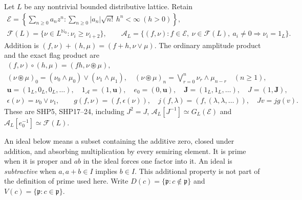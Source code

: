 Let $L$ be any nontrivial bounded distributive lattice. Retain
\begin{equation}\tag{HFP1}
\begin{gathered}
 \mathcal E=\left\{\sum_{n\ge0}a_nz^n:
       \sum_{n\ge0}|a_n|\sqrt{n!}\,h^n<\infty\ (h>0)\right\},\\
 \mathcal F(L)=\{\nu\in L^{\mathbb N_0}:\nu_i\ge\nu_{i+2}\},\qquad
 \mathcal A_L=\{(f,\nu):f\in\mathcal E,\ \nu\in\mathcal F(L),
                         \ a_i\ne0\Rightarrow\nu_i=1_L\}.
\end{gathered}
\end{equation}
Addition is $(f,\nu)+(h,\mu)=(f+h,\nu\vee\mu)$. The ordinary
amplitude product and the exact flag product are
\begin{equation}\tag{HFP2}
\begin{gathered}
 (f,\nu)\circ(h,\mu)=(fh,\nu\circledast\mu),\\
 (\nu\circledast\mu)_0=(\nu_0\wedge\mu_0)\vee(\nu_1\wedge\mu_1),
 \quad
 (\nu\circledast\mu)_n=\bigvee_{r=0}^n\nu_r\wedge\mu_{n-r}\quad(n\ge1),\\
 \mathbf u=(1_L,0_L,0_L,\ldots),\quad
 1_{\mathcal A}=(1,\mathbf u),\quad e_0=(0,\mathbf u),\quad
 \mathbf J=(1_L,1_L,\ldots),\quad J=(1,\mathbf J),\\
 \epsilon(\nu)=\nu_0\vee\nu_1,\qquad
 g(f,\nu)=(f,\epsilon(\nu)),\quad
 j(f,\lambda)=(f,(\lambda,\lambda,\ldots)),\quad Jv=jg(v).
\end{gathered}
\end{equation}
These are SHP5, SHP17--24, including $J^2=J$,
$\mathcal A_L[J^{-1}]\simeq G_L(\mathcal E)$ and
$\mathcal A_L[e_0^{-1}]\simeq\mathcal F(L)$.

An ideal below means a subset containing the additive zero, closed
under addition, and absorbing multiplication by every semiring
element. It is prime when it is proper and $ab$ in the ideal forces
one factor into it. An ideal is \emph{subtractive} when
$a,a+b\in I$ implies $b\in I$. This additional property is not
part of the definition of prime used here. Write
$D(c)=\{\mathfrak p:c\notin\mathfrak p\}$ and
$V(c)=\{\mathfrak p:c\in\mathfrak p\}$.

